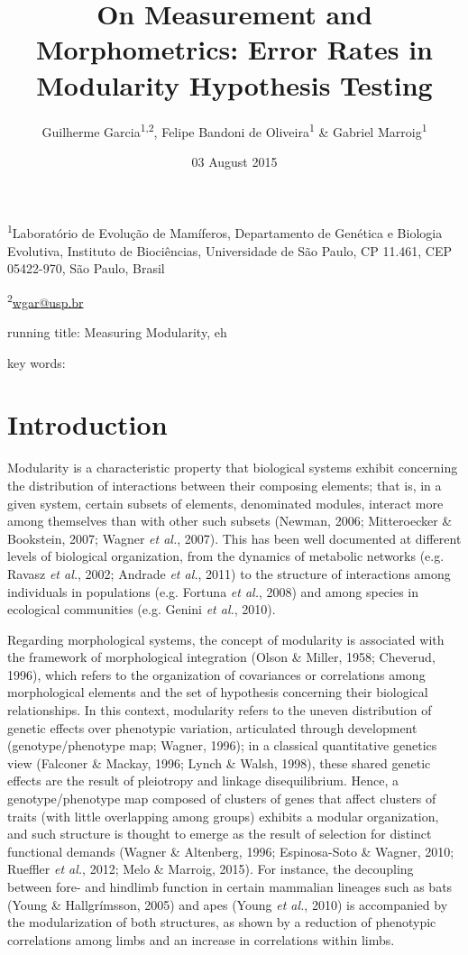 \documentclass[12pt,]{article}
\title{On Measurement and Morphometrics: Error Rates in Modularity Hypothesis
Testing}
\author{Guilherme Garcia\textsuperscript{1,2}, Felipe Bandoni de
Oliveira\textsuperscript{1} \& Gabriel Marroig\textsuperscript{1}}
\date{03 August 2015}
\begin{document}
\maketitle


\linenumbers
\modulolinenumbers[2]

\onehalfspacing

\textsuperscript{1}Laboratório de Evolução de Mamíferos, Departamento de
Genética e Biologia Evolutiva, Instituto de Biociências, Universidade de
São Paulo, CP 11.461, CEP 05422-970, São Paulo, Brasil

\textsuperscript{2}\href{mailto:wgar@usp.br}{wgar@usp.br}

running title: Measuring Modularity, eh

key words:

\section{Introduction}\label{introduction}

Modularity is a characteristic property that biological systems exhibit
concerning the distribution of interactions between their composing
elements; that is, in a given system, certain subsets of elements,
denominated modules, interact more among themselves than with other such
subsets (Newman, 2006; Mitteroecker \& Bookstein, 2007; Wagner \emph{et
al.}, 2007). This has been well documented at different levels of
biological organization, from the dynamics of metabolic networks (e.g.
Ravasz \emph{et al.}, 2002; Andrade \emph{et al.}, 2011) to the
structure of interactions among individuals in populations (e.g. Fortuna
\emph{et al.}, 2008) and among species in ecological communities (e.g.
Genini \emph{et al.}, 2010).

Regarding morphological systems, the concept of modularity is associated
with the framework of morphological integration (Olson \& Miller, 1958;
Cheverud, 1996), which refers to the organization of covariances or
correlations among morphological elements and the set of hypothesis
concerning their biological relationships. In this context, modularity
refers to the uneven distribution of genetic effects over phenotypic
variation, articulated through development (genotype/phenotype map;
Wagner, 1996); in a classical quantitative genetics view (Falconer \&
Mackay, 1996; Lynch \& Walsh, 1998), these shared genetic effects are
the result of pleiotropy and linkage disequilibrium. Hence, a
genotype/phenotype map composed of clusters of genes that affect
clusters of traits (with little overlapping among groups) exhibits a
modular organization, and such structure is thought to emerge as the
result of selection for distinct functional demands (Wagner \&
Altenberg, 1996; Espinosa-Soto \& Wagner, 2010; Rueffler \emph{et al.},
2012; Melo \& Marroig, 2015). For instance, the decoupling between fore-
and hindlimb function in certain mammalian lineages such as bats (Young
\& Hallgrímsson, 2005) and apes (Young \emph{et al.}, 2010) is
accompanied by the modularization of both structures, as shown by a
reduction of phenotypic correlations among limbs and an increase in
correlations within limbs.
\end{document}
